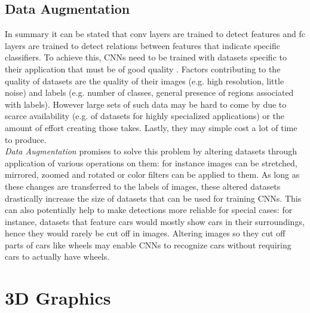 \subsection{Data Augmentation}
In summary it can be stated that \ac{conv} layers are trained to detect features and \ac{fc} layers are trained to detect relations between features that indicate specific classifiers. To achieve this, \acp{CNN} need to be trained with datasets specific to their application that must be of good quality \cite{Schweitzer2017}. Factors contributing to the quality of datasets are the quality of their images (e.g. high resolution, little noise) and labels (e.g. number of classes, general presence of regions associated with labels). However large sets of such data may be hard to come by due to scarce availability (e.g. of datasets for highly specialized applications) or the amount of effort creating those takes. Lastly, they may simple cost a lot of time to produce.\\
\textit{Data Augmentation} promises to solve this problem by altering datasets through application of various operations on them: for instance images can be stretched, mirrored, zoomed and rotated or color filters can be applied to them. As long as these changes are transferred to the labels of images, these altered datasets drastically increase the size of datasets that can be used for training \acp{CNN}. This can also potentially help to make detections more reliable for special cases: for instance, datasets that feature cars would mostly show cars in their surroundings, hence they would rarely be cut off in images. Altering images so they cut off parts of cars like wheels may enable \acp{CNN} to recognize cars without requiring cars to actually have wheels.

\section{3D Graphics}
